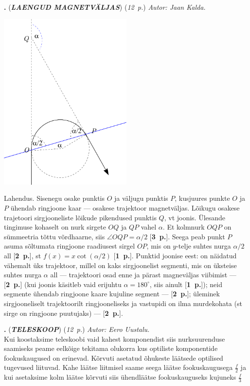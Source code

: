\documentclass[12pt,a5paper]{article}
\newcommand{\numb}[1]{\vspace{5pt}\textbf{\large #1}}
\newcommand{\nimi}[1]{(\textsl{\small #1})}
\newcommand{\punktid}[1]{(\emph{#1~p.})}
\newcounter{ylesanne}
\newcommand{\yl}[1]{\addtocounter{ylesanne}{1}\numb{\theylesanne.} \nimi{\bf{#1}} \newblock{}}
\newcommand{\pp}[1]{[\textbf{#1~p.}]}
\newcommand{\autor}[1]{\emph{ Autor: #1.\\}}
\begin{document}
\vspace{10pt}
\yl{LAENGUD MAGNETVÄLJAS} \punktid{12} \autor{Jaan Kalda}
\vspace{-10pt}
  \begin{center}
    \includegraphics[width=0.5\textwidth]{laeng_b-s}
  \end{center}
  \vspace{-10pt}
Lahendus. Sisenegu osake punktis $O$ ja väljugu punktis $P$, kusjuures punkte $O$ ja $P$ ühendab ringjoone kaar --- osakese trajektoor magnetväljas. Lõikugu osakese trajetoori sirgjooneliste lõikude pikendused punktis $Q$, vt joonis. Ülesande tingimuse kohaselt on nurk sirgete $OQ$ ja $QP$ vahel $\alpha$. Et kolmnurk $OQP$ on sümmeetria tõttu võrdhaarne, siis $\angle OQP=\alpha/2$  \pp{3}. Seega peab punkt $P$ asuma sõltumata ringjoone raadiusest sirgel $OP$, mis on $y$-telje suhtes nurga $\alpha/2$ all  \pp{2}, st $f(x)=x\cot(\alpha/2)$  \pp{1}. Punktid joonise eest: on näidatud vähemalt üks trajektoor, millel on kaks sirgjoonelist segmenti, mis on üksteise suhtes nurga $\alpha$ all --- trajektoori osad enne ja pärast magneväljas viibimist --- \pp{2} (kui joonis käsitleb vaid erijuhtu $\alpha=180^\circ$, siis ainult \pp{1}); neid segmente ühendab ringjoone kaare kujuline segment --- \pp{2}; üleminek sirgjooneliselt trajektoorilt ringjooneliseks ja vastupidi on ilma murdekohata (st sirge on ringjoone puutujaks) --- \pp{2}.

\vspace{10pt}
\yl{TELESKOOP} \punktid{12} \autor{Eero Uustalu}
Kui koostaksime teleskoobi vaid kahest komponendist siis nurksuurenduse saamiseks peame eelkõige tekitama olukorra kus optiliste komponentide fookuskaugused on erinevad.
Kõrvuti asetatud õhukeste läätsede optilised tugevused liituvad. Kahe läätse liitmisel saame seega läätse fookuskaugusega $ \frac{f}{2} $ ja kui asetaksime kolm läätse kõrvuti siis ühendläätse fookuskauguseks kujuneks $ \frac{f}{3} $
\end{document}
